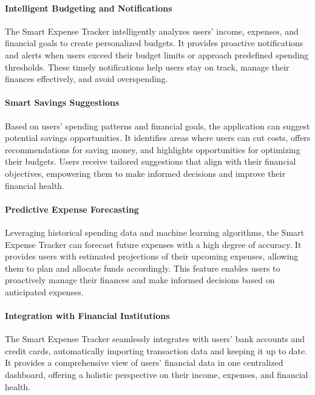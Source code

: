 \paragraph{Intelligent Budgeting and Notifications}
The Smart Expense Tracker intelligently analyzes users' income, expenses, and financial goals to create personalized 
budgets. It provides proactive notifications and alerts when users exceed their budget limits or approach predefined 
spending thresholds. These timely notifications help users stay on track, manage their finances effectively, and 
avoid overspending.

\paragraph{Smart Savings Suggestions}
Based on users' spending patterns and financial goals, the application can suggest potential savings opportunities. 
It identifies areas where users can cut costs, offers recommendations for saving money, and highlights opportunities 
for optimizing their budgets. Users receive tailored suggestions that align with their financial objectives, 
empowering them to make informed decisions and improve their financial health.

\paragraph{Predictive Expense Forecasting}
Leveraging historical spending data and machine learning algorithms, the Smart Expense Tracker can forecast future 
expenses with a high degree of accuracy. It provides users with estimated projections of their upcoming expenses, 
allowing them to plan and allocate funds accordingly. This feature enables users to proactively manage their 
finances and make informed decisions based on anticipated expenses.

\paragraph{Integration with Financial Institutions}
The Smart Expense Tracker seamlessly integrates with users' bank accounts and credit cards, automatically importing 
transaction data and keeping it up to date. It provides a comprehensive view of users' financial data in one 
centralized dashboard, offering a holistic perspective on their income, expenses, and financial health.\\
\\

